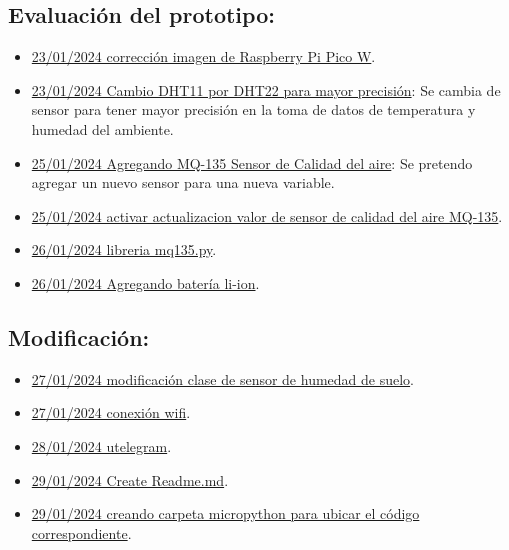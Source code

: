 \subsection{Evaluación del prototipo:}
\begin{itemize}
\item \href{https://github.com/JLCaballeroMQ/Proyecto_TFG_UBU_23_24/tree/7a8e4797d4beccac2154441b5f58c06a0fb897e1}{23/01/2024 corrección imagen de Raspberry Pi Pico W}.
\item \href{https://github.com/JLCaballeroMQ/Proyecto_TFG_UBU_23_24/tree/427464aacd4f928b9e289856624a46a3d6396f0f}{23/01/2024 Cambio DHT11 por DHT22 para mayor precisión}: Se cambia de sensor para tener mayor precisión en la toma de datos de temperatura y humedad del ambiente.
\item \href{https://github.com/JLCaballeroMQ/Proyecto_TFG_UBU_23_24/tree/7cc624a24d9c55fcda34d729ce8ad786b8e3f09a}{25/01/2024 Agregando MQ-135 Sensor de Calidad del aire}: Se pretendo agregar un nuevo sensor para una nueva variable.
\item \href{https://github.com/JLCaballeroMQ/Proyecto_TFG_UBU_23_24/tree/b5379807ec368184ad950f4e7b9a146093f6e6e3}{25/01/2024 activar actualizacion valor de sensor de calidad del aire MQ-135}.
\item \href{https://github.com/JLCaballeroMQ/Proyecto_TFG_UBU_23_24/tree/a2555b5ba84b78c3436fc82d044bb32968428102}{26/01/2024 libreria mq135.py}.
\item \href{https://github.com/JLCaballeroMQ/Proyecto_TFG_UBU_23_24/tree/1a039b3c8fdc5c2627f46f62ef4b9e2bbd54c205}{26/01/2024 Agregando batería li-ion}.
\end{itemize}

\subsection{Modificación:}
\begin{itemize}
\item \href{https://github.com/JLCaballeroMQ/Proyecto_TFG_UBU_23_24/tree/f3ced8cc9d92da3067f8a2c88764539d0f8f5c07}{27/01/2024 modificación clase de sensor de humedad de suelo}.
\item \href{https://github.com/JLCaballeroMQ/Proyecto_TFG_UBU_23_24/tree/79baaa913bfe3e28a3727e569ea3ac71700de482}{27/01/2024 conexión wifi}.
\item \href{https://github.com/JLCaballeroMQ/Proyecto_TFG_UBU_23_24/tree/cbcb95bd5bbfe7cbc38c848d1082c4fa8018233f}{28/01/2024 utelegram}.
\item \href{https://github.com/JLCaballeroMQ/Proyecto_TFG_UBU_23_24/tree/446a04def85eb45d726e5e43e06510d1596eb0a6}{29/01/2024 Create Readme.md}.
\item \href{https://github.com/JLCaballeroMQ/Proyecto_TFG_UBU_23_24/tree/36b1875d18072b0d159ce1c946f4fab3172fdc6c}{29/01/2024 creando carpeta micropython para ubicar el código correspondiente}.
\end{itemize}

